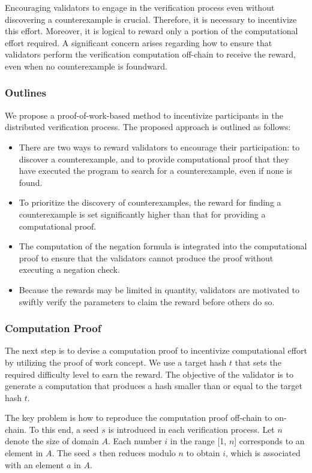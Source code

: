 \documentclass[runningheads]{llncs}
\begin{document}
Encouraging validators to engage in the verification process even without discovering a counterexample is crucial. Therefore, it is necessary to incentivize this effort. Moreover, it is logical to reward only a portion of the computational effort required. A significant concern arises regarding how to ensure that validators perform the verification computation off-chain to receive the reward, even when no counterexample is foundward.

\subsubsection{Outlines}
We propose a proof-of-work-based method to incentivize participants in the distributed verification process. The proposed approach is outlined as follows:

\begin{itemize}
\item There are two ways to reward validators to encourage their participation: to discover a counterexample, and to provide computational proof that they have executed the program to search for a counterexample, even if none is found.
\item To prioritize the discovery of counterexamples, the reward for finding a counterexample is set significantly higher than that for providing a computational proof.
\item The computation of the negation formula is integrated into the computational proof to ensure that the validators cannot produce the proof without executing a negation check.
\item Because the rewards may be limited in quantity, validators are motivated to swiftly verify the parameters to claim the reward before others do so.
\end{itemize}
\subsubsection{Computation Proof}
The next step is to devise a computation proof to incentivize computational effort by utilizing the proof of work concept. We use a target hash $t$ that sets the required difficulty level to earn the reward. The objective of the validator is to generate a computation that produces a hash smaller than or equal to the target hash $t$. 

The key problem is how to reproduce the computation proof off-chain to on-chain. To this end, a seed $s$ is introduced in each verification process. Let $n$ denote the size of domain $A$. Each number $i$ in the range [1, $n$] corresponds to an element in $A$. The seed $s$ then reduces modulo $n$ to obtain $i$, which is  associated with an element $a$ in $A$. 
\end{document}
